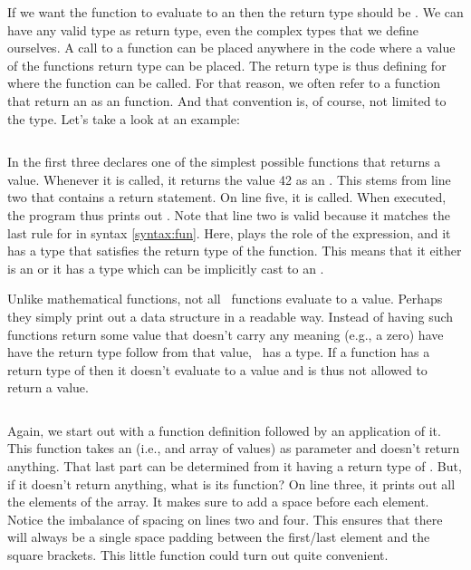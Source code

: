If we want the function to evaluate to an  then the return type should be . We can have any valid type as return type, even the complex types that we define ourselves. A call to a function can be placed anywhere in the code where a value of the functions return type can be placed. The return type is thus defining for where the function can be called. For that reason, we often refer to a function that return an  as an  function. And that convention is, of course, not limited to the  type. Let's take a look at an example:

\inputminted[linenos]{csharp}{../src/csharp/functions/return/Program.cs}

In the first three declares one of the simplest possible functions that returns a value. Whenever it is called, it returns the value 42 as an . This stems from line two that contains a return statement. On line five, it is called. When executed, the program thus prints out . Note that line two is valid because it matches the last rule for  in syntax \ref{syntax:fun}. Here,  plays the role of the expression, and it has a type that satisfies the return type of the function. This means that it either is an  or it has a type which can be implicitly cast to an .

Unlike mathematical functions, not all \csharp\ functions evaluate to a value. Perhaps they simply print out a data structure in a readable way. Instead of having such functions return some value that doesn't carry any meaning (e.g., a zero) have have the return type follow from that value, \csharp\ has a  type. If a function has a return type of  then it doesn't evaluate to a value and is thus not allowed to return a value.

\inputminted[linenos]{csharp}{../src/csharp/functions/void/Program.cs}

Again, we start out with a function definition followed by an application of it. This function takes an  (i.e., and array of  values) as parameter and doesn't return anything. That last part can be determined from it having a return type of . But, if it doesn't return anything, what is its function? On line three, it prints out all the elements of the array. It makes sure to add a space before each element. Notice the imbalance of spacing on lines two and four. This ensures that there will always be a single space padding between the first/last element and the square brackets. This little function could turn out quite convenient.

